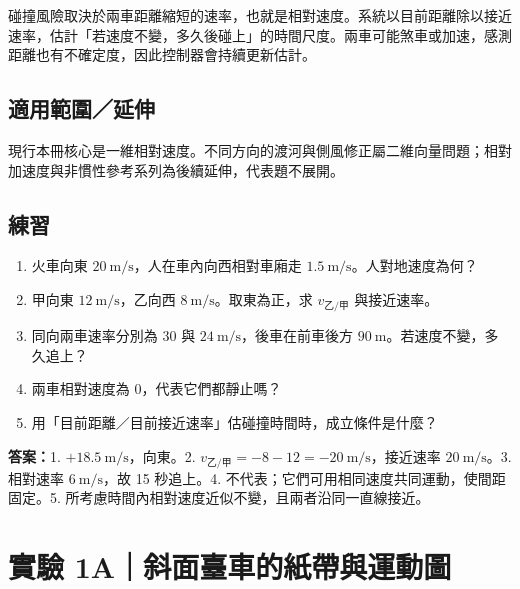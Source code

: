 \documentclass[11pt,a4paper]{article}
\providecommand{\tightlist}{%
  \setlength{\itemsep}{0pt}\setlength{\parskip}{0pt}}
\begin{document}
碰撞風險取決於兩車距離縮短的速率，也就是相對速度。系統以目前距離除以接近速率，估計「若速度不變，多久後碰上」的時間尺度。兩車可能煞車或加速，感測距離也有不確定度，因此控制器會持續更新估計。

\subsection{適用範圍／延伸}\label{ux9069ux7528ux7bc4ux570dux5ef6ux4f38}

現行本冊核心是一維相對速度。不同方向的渡河與側風修正屬二維向量問題；相對加速度與非慣性參考系列為後續延伸，代表題不展開。

\begin{HandoutSelfCheck}

\subsection{練習}\label{ux7df4ux7fd2-5}

\begin{enumerate}
\def\labelenumi{\arabic{enumi}.}
\tightlist
\item
  火車向東 \(20\ \mathrm{m/s}\)，人在車內向西相對車廂走 \(1.5\ \mathrm{m/s}\)。人對地速度為何？
\item
  甲向東 \(12\ \mathrm{m/s}\)，乙向西 \(8\ \mathrm{m/s}\)。取東為正，求 \(v_{\text{乙/甲}}\) 與接近速率。
\item
  同向兩車速率分別為 \(30\) 與 \(24\ \mathrm{m/s}\)，後車在前車後方 \(90\ \mathrm m\)。若速度不變，多久追上？
\item
  兩車相對速度為 0，代表它們都靜止嗎？
\item
  用「目前距離／目前接近速率」估碰撞時間時，成立條件是什麼？
\end{enumerate}

\textbf{答案：}1. \(+18.5\ \mathrm{m/s}\)，向東。2. \(v_{\text{乙/甲}}=-8-12=-20\ \mathrm{m/s}\)，接近速率 \(20\ \mathrm{m/s}\)。3. 相對速率 \(6\ \mathrm{m/s}\)，故 15 秒追上。4. 不代表；它們可用相同速度共同運動，使間距固定。5. 所考慮時間內相對速度近似不變，且兩者沿同一直線接近。

\end{HandoutSelfCheck}

\section{實驗 1A｜斜面臺車的紙帶與運動圖}\label{ux5be6ux9a57-1aux659cux9762ux81faux8ecaux7684ux7d19ux5e36ux8207ux904bux52d5ux5716}
\end{document}
